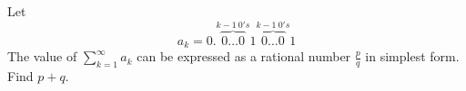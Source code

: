 Let$$a_k = 0.\overbrace{0 \ldots 0}^{k - 1 \: 0's} 1 \overbrace{0 \ldots 0}^{k - 1 \: 0's} 1$$The value of $\sum_{k = 1}^\infty a_k$ can be expressed as a rational number $\frac{p}{q}$ in simplest form. Find $p + q$.